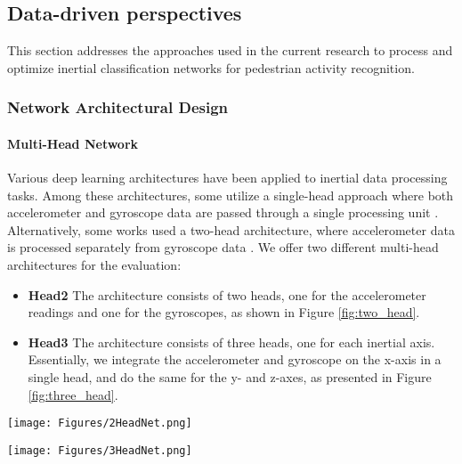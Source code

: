 \documentclass[journal]{IEEEtran}
\begin{document}
\subsection{Data-driven perspectives} \label{sec:paradigms}
\noindent This section addresses the approaches used in the current research to process and optimize inertial classification networks for pedestrian activity recognition. 
%
\subsubsection{Network Architectural Design}
\paragraph{\textbf{Multi-Head Network}} \label{sec:multi_head}
Various deep learning architectures have been applied to inertial data processing tasks. Among these architectures, some utilize a single-head approach where both accelerometer and gyroscope data are passed through a single processing unit \cite{herath2020ronin,esfahani2019aboldeepio, shavit2021boosting}. Alternatively, some works used a two-head architecture, where accelerometer data is processed separately from gyroscope data \cite{silva2019end,liu2023smartphone}.  We offer two different multi-head architectures for the evaluation:
\begin{itemize}
\item \textbf{Head2} The architecture consists of two heads, one for the accelerometer readings and one for the gyroscopes, as shown in Figure \ref{fig:two_head}. 
\item \textbf{Head3}  The architecture consists of three heads, one for each inertial axis. Essentially, we integrate the accelerometer and gyroscope on the x-axis in a single head, and do the same for the y- and z-axes, as presented in Figure \ref{fig:three_head}.
\end{itemize}
%
\begin{figure*}[!htb]
    \centering
    \texttt{[image: Figures/2HeadNet.png]}
    \caption{Head2 architecture. One head receives the accelerometer readings and the other receives the gyrosopce readings.}
    \label{fig:two_head}
\end{figure*}
%
\begin{figure*}[!htb]
    \centering
    \texttt{[image: Figures/3HeadNet.png]}
    \caption{Head3 architecture. Each head receives the accelerometer and gyroscope readings along the x,y, and z axes.}
    \label{fig:three_head}
\end{figure*}
%
%
\end{document}
